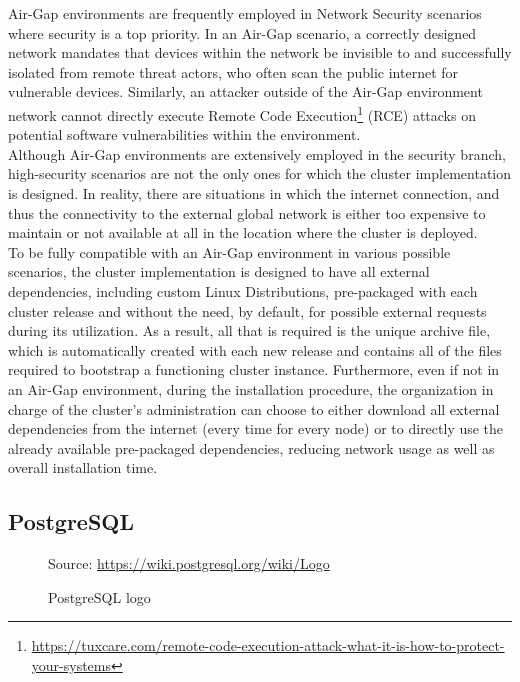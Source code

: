 Air-Gap environments are frequently employed in Network Security scenarios where
security is a top priority. In an Air-Gap scenario, a correctly designed network
mandates that devices within the network be invisible to and successfully isolated
from remote threat actors, who often scan the public internet for vulnerable
devices. Similarly, an attacker outside of the Air-Gap environment network
cannot directly execute Remote Code Execution\footnote{\url{https://tuxcare.com/remote-code-execution-attack-what-it-is-how-to-protect-your-systems}}
(RCE) attacks on potential software vulnerabilities within the environment\cite{airgap}.
\\ %
Although Air-Gap environments are extensively employed in the security branch,
high-security scenarios are not the only ones for which the cluster
implementation is designed. In reality, there are situations in which the
internet connection, and thus the connectivity to the external global network is
either too expensive to maintain or not available at all in the location where the
cluster is deployed. \\ %
To be fully compatible with an Air-Gap environment in various possible scenarios,
the cluster implementation is designed to have all external dependencies, including
custom Linux Distributions, pre-packaged with each cluster release and without
the need, by default, for possible external requests during its utilization. As a
result, all that is required is the unique archive file, which is automatically created
with each new release and contains all of the files required to bootstrap a functioning
cluster instance. Furthermore, even if not in an Air-Gap environment, during the
installation procedure, the organization in charge of the cluster's administration
can choose to either download all external dependencies from the internet (every
time for every node) or to directly use the already available pre-packaged dependencies,
reducing network usage as well as overall installation time.

\subsection{PostgreSQL}
\label{subsec:implementation_dependencies_postgresql}

\begin{figure} %
  \centering
  \def\stackalignment{l} %
  {\scriptsize \parbox[t]{\linewidth}{ Source: \url{https://wiki.postgresql.org/wiki/Logo}} }
  \caption{PostgreSQL logo}
\end{figure}

